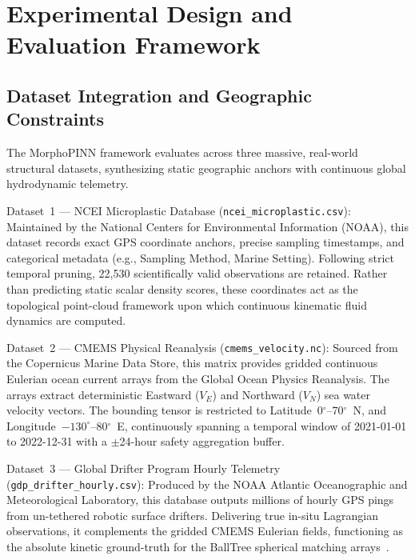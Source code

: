 \documentclass[conference]{IEEEtran}
\begin{document}
\section{Experimental Design and Evaluation Framework}

\subsection{Dataset Integration and Geographic Constraints}
The MorphoPINN framework evaluates across three massive, real-world structural datasets, synthesizing static geographic anchors with continuous global hydrodynamic telemetry.

\noindent Dataset~1 --- NCEI Microplastic Database (\texttt{ncei\_microplastic.csv}):
Maintained by the National Centers for Environmental Information (NOAA), this dataset records exact GPS coordinate anchors, precise sampling timestamps, and categorical metadata (e.g., Sampling Method, Marine Setting). Following strict temporal pruning, 22,530 scientifically valid observations are retained. Rather than predicting static scalar density scores, these coordinates act as the topological point-cloud framework upon which continuous kinematic fluid dynamics are computed.

\noindent Dataset~2 --- CMEMS Physical Reanalysis (\texttt{cmems\_velocity.nc}):
Sourced from the Copernicus Marine Data Store, this matrix provides gridded continuous Eulerian ocean current arrays from the Global Ocean Physics Reanalysis. The arrays extract deterministic Eastward ($V_E$) and Northward ($V_N$) sea water velocity vectors. The bounding tensor is restricted to Latitude~0$^\circ$--70$^\circ$~N, and Longitude~$-130^\circ$--80$^\circ$~E, continuously spanning a temporal window of 2021-01-01 to 2022-12-31 with a $\pm$24-hour safety aggregation buffer.

\noindent Dataset~3 --- Global Drifter Program Hourly Telemetry (\texttt{gdp\_drifter\_hourly.csv}):
Produced by the NOAA Atlantic Oceanographic and Meteorological Laboratory, this database outputs millions of hourly GPS pings from un-tethered robotic surface drifters. Delivering true in-situ Lagrangian observations, it complements the gridded CMEMS Eulerian fields, functioning as the absolute kinetic ground-truth for the BallTree spherical matching arrays~\cite{ref29}.
\end{document}
